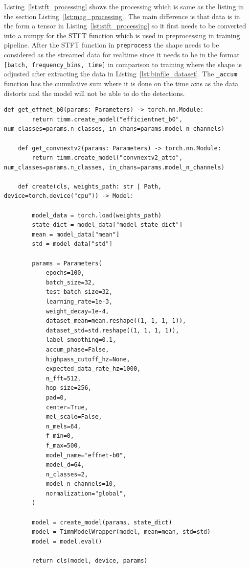 Listing~\ref{lst:stft_processing} shows the processing which is same as the listing in the section Listing~\ref{lst:mag_processing}. The main difference is that data is in the form a tensor in Listing~\ref{lst:stft_processing} so it first needs to be converted into a numpy for the STFT function which is used in preprocessing in training pipeline. After the STFT function in \texttt{preprocess} the shape needs to be considered as the streamed data for realtime since it needs to be in the format \texttt{[batch, frequency\_bins, time]} in comparison to training where the shape is adjusted after extracting the data in Listing~\ref{lst:binfile_dataset}. The \texttt{\_accum} function has the cumulative sum where it is done on the time axis as the data distorts and the model will not be able to do the detections.

    \begin{lstlisting}[style=pythonstyle, caption={Model evaluation mode in the framework}, label=lst:model_rt]
    def get_effnet_b0(params: Parameters) -> torch.nn.Module:
        return timm.create_model("efficientnet_b0", num_classes=params.n_classes, in_chans=params.model_n_channels)

    def get_convnextv2(params: Parameters) -> torch.nn.Module:
        return timm.create_model("convnextv2_atto", num_classes=params.n_classes, in_chans=params.model_n_channels)

    def create(cls, weights_path: str | Path, device=torch.device("cpu")) -> Model:

        model_data = torch.load(weights_path)
        state_dict = model_data["model_state_dict"]
        mean = model_data["mean"]
        std = model_data["std"]

        params = Parameters(
            epochs=100,
            batch_size=32,
            test_batch_size=32,
            learning_rate=1e-3,
            weight_decay=1e-4,
            dataset_mean=mean.reshape((1, 1, 1, 1)),
            dataset_std=std.reshape((1, 1, 1, 1)),
            label_smoothing=0.1,
            accum_phase=False,
            highpass_cutoff_hz=None,
            expected_data_rate_hz=1000,
            n_fft=512,
            hop_size=256,
            pad=0,
            center=True,
            mel_scale=False,
            n_mels=64,
            f_min=0,
            f_max=500,
            model_name="effnet-b0",
            model_d=64,
            n_classes=2,
            model_n_channels=10,
            normalization="global",
        )

        model = create_model(params, state_dict)
        model = TimmModelWrapper(model, mean=mean, std=std)
        model = model.eval()

        return cls(model, device, params)

    \end{lstlisting}

